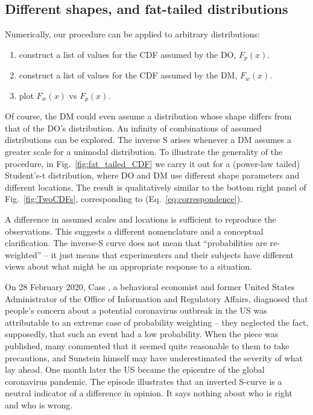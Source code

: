 \documentclass[a4paper, 12pt]{article}
\newcommand{\eref}[1]{(Eq.~\ref{eq:#1})}
\newcommand{\fref}[1]{Fig.~\ref{fig:#1}}
\newcommand{\seclabel}[1]{\label{sec:#1}}
\begin{document}
\subsection{Different shapes, and fat-tailed distributions\seclabel{Different_shapes}}
Numerically, our procedure can be applied to arbitrary distributions: 
\begin{enumerate}
\item
construct a list of values for the CDF assumed by the DO, $F_p(x)$.
\item
construct a list of values for the CDF assumed by the DM, $F_w(x)$.
\item
plot $F_w(x)$ vs $F_p(x)$.
\end{enumerate}
Of course, the DM could even assume a distribution whose shape differs from that of the DO's distribution. An infinity of combinations of assumed distributions can be explored. The inverse S arises whenever a DM assumes a greater scale for a unimodal distribution. To illustrate the generality of the procedure, in \fref{fat_tailed_CDF} we carry it out for a (power-law tailed) Student's-t distribution, where DO and DM use different shape parameters and different locations. The result is qualitatively similar to the bottom right panel of \fref{TwoCDFs}, corresponding to \eref{correspondence}. 

A difference in assumed scales and locations is sufficient to reproduce the observations. This suggests a different nomenclature and a conceptual clarification. The inverse-S curve does not mean that ``probabilities are re-weighted'' -- it just means that experimenters and their subjects have different views about what might be an appropriate response to a situation. 

On 28 February 2020, Cass \citet{Sunstein2020}, a behavioral economist and former United States Administrator of the Office of Information and Regulatory Affairs, diagnosed that people's concern about a potential coronavirus outbreak in the US was attributable to an extreme case of probability weighting -- they neglected the fact, supposedly, that such an event had a low probability. When the piece was published, many commented that it seemed quite reasonable to them to take precautions, and Sunstein himself may have underestimated the severity of what lay ahead. One month later the US became the epicentre of the global coronavirus pandemic.
The episode illustrates that an inverted S-curve is a neutral indicator of a difference in opinion. It says nothing about who is right and who is wrong.
\end{document}
